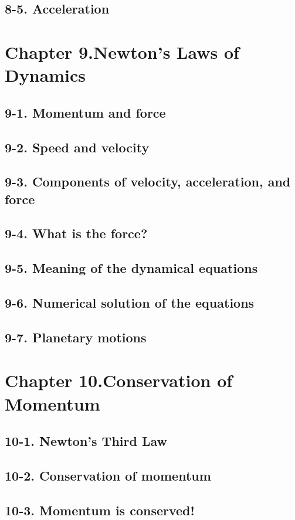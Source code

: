 \documentclass{article}
\begin{document}
\subsection{8-5. Acceleration}
\section{Chapter 9.Newton’s Laws of Dynamics}
\subsection{9-1. Momentum and force}
\subsection{9-2. Speed and velocity}
\subsection{9-3. Components of velocity, acceleration, and force}
\subsection{9-4. What is the force?}
\subsection{9-5. Meaning of the dynamical equations}
\subsection{9-6. Numerical solution of the equations}
\subsection{9-7. Planetary motions}
\section{Chapter 10.Conservation of Momentum}
\subsection{10-1. Newton’s Third Law}
\subsection{10-2. Conservation of momentum}
\subsection{10-3. Momentum is conserved!}
\end{document}
